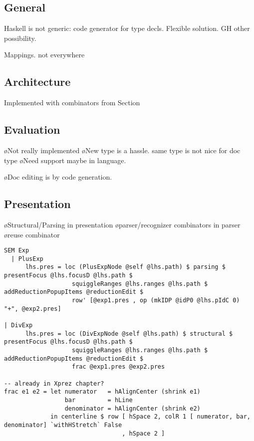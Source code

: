 \subsection{General}

Haskell is not generic: code generator for type decls. Flexible solution. GH other possibility.

Mappings. not everywhere

\subsection{Architecture}

Implemented with combinators from Section



\subsection{Evaluation}

\bl
\o Not really implemented
\o New type is a hassle. same type is not nice for doc type
\o Need support maybe in language. 
\el

\bl
\o Doc editing is by code generation.
\el

\subsection{Presentation}

\bl
\o Structural/Parsing in presentation
\o parser/recognizer combinators in parser
\o reuse combinator
\el


\begin{verbatim}
SEM Exp
  | PlusExp
      lhs.pres = loc (PlusExpNode @self @lhs.path) $ parsing $ presentFocus @lhs.focusD @lhs.path $
                   squiggleRanges @lhs.ranges @lhs.path $ addReductionPopupItems @reductionEdit $
                   row' [@exp1.pres , op (mkIDP @idP0 @lhs.pIdC 0) "+", @exp2.pres]

| DivExp      
      lhs.pres = loc (DivExpNode @self @lhs.path) $ structural $ presentFocus @lhs.focusD @lhs.path $
                   squiggleRanges @lhs.ranges @lhs.path $ addReductionPopupItems @reductionEdit $
                   frac @exp1.pres @exp2.pres

-- already in Xprez chapter?
frac e1 e2 = let numerator   = hAlignCenter (shrink e1)
                 bar         = hLine
                 denominator = hAlignCenter (shrink e2)
             in centerline $ row [ hSpace 2, colR 1 [ numerator, bar, denominator] `withHStretch` False
                                 , hSpace 2 ]
\end{verbatim}

